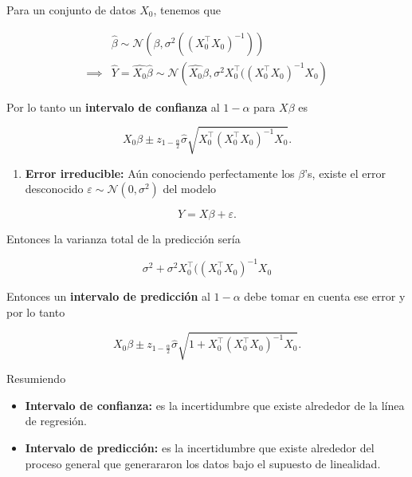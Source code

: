 \documentclass[
  12pt,
]{book}
\providecommand{\tightlist}{%
  \setlength{\itemsep}{0pt}\setlength{\parskip}{0pt}}
\theoremstyle{definition}
\theoremstyle{definition}
\theoremstyle{definition}
\theoremstyle{remark}
\begin{document}
Para un conjunto de datos \(X_{0}\), tenemos que

\begin{align*}
 & \hat{\beta} \sim  \mathcal{N}\left(\beta, \sigma^{2}\left( (X_{0}^{\top}X_{0})^{-1} \right)\right) \\
 \implies & \hat{Y} = \hat{X_{0}}\hat{\beta} \sim \mathcal{N}\left(\hat{X_{0}}\beta , \sigma^{2}X_{0}^{\top}((X_{0}^{\top}X_{0})^{-1}X_{0}  \right)
\end{align*}

Por lo tanto un \textbf{intervalo de confianza} al \(1-\alpha\) para \(X\beta\) es

\begin{equation*}
X_{0}\beta \pm z_{1-\frac{\alpha}{2}} \hat{\sigma} \sqrt{X_{0}^{\top}(X_{0}^{\top}X_{0})^{-1}X_{0}}.
\end{equation*}

\begin{enumerate}
\def\labelenumi{\arabic{enumi}.}
\setcounter{enumi}{1}
\tightlist
\item
  \textbf{Error irreducible:} Aún conociendo perfectamente los \(\beta\)'s, existe el error desconocido \(\varepsilon\sim \mathcal{N}\left(0,\sigma^{2}\right)\) del modelo
\end{enumerate}

\begin{equation*}
Y = X\beta + \varepsilon.
\end{equation*}

Entonces la varianza total de la predicción sería

\begin{equation*}
\sigma^{2} +  \sigma^{2}X_{0}^{\top}( (X_{0}^{\top}X_{0})^{-1}X_{0} 
\end{equation*}

Entonces un \textbf{intervalo de predicción} al \(1-\alpha\) debe tomar en cuenta ese error y por lo tanto

\begin{equation*}
X_{0}\beta \pm z_{1-\frac{\alpha}{2}} \hat{\sigma} \sqrt{1+X_{0}^{\top}(X_{0}^{\top}X_{0})^{-1}X_{0}}.
\end{equation*}

Resumiendo

\begin{itemize}
\tightlist
\item
  \textbf{Intervalo de confianza:} es la incertidumbre que existe alrededor de la línea de regresión.
\item
  \textbf{Intervalo de predicción:} es la incertidumbre que existe alrededor del proceso general que generararon los datos bajo el supuesto de linealidad.
\end{itemize}
\end{document}
